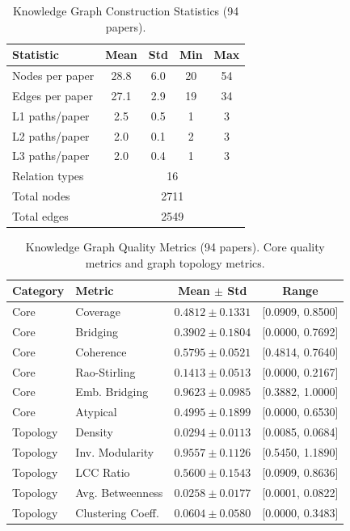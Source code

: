 \begin{table}[t]
\centering
\caption{Knowledge Graph Construction Statistics (94 papers).}
\label{tab:kg_stats}
\begin{tabular}{lcccc}
\toprule
\textbf{Statistic} & \textbf{Mean} & \textbf{Std} & \textbf{Min} & \textbf{Max} \\
\midrule
Nodes per paper  & 28.8 & 6.0 & 20 & 54 \\
Edges per paper  & 27.1 & 2.9 & 19 & 34 \\
L1 paths/paper   & 2.5 & 0.5 & 1 & 3 \\
L2 paths/paper   & 2.0 & 0.1 & 2 & 3 \\
L3 paths/paper   & 2.0 & 0.4 & 1 & 3 \\
Relation types   & \multicolumn{4}{c}{16} \\
Total nodes      & \multicolumn{4}{c}{2711} \\
Total edges      & \multicolumn{4}{c}{2549} \\
\bottomrule
\end{tabular}
\end{table}

\begin{table}[t]
\centering
\caption{Knowledge Graph Quality Metrics (94 papers). Core quality metrics and graph topology metrics.}
\label{tab:kg_metrics}
\begin{tabular}{llcc}
\toprule
\textbf{Category} & \textbf{Metric} & \textbf{Mean $\pm$ Std} & \textbf{Range} \\
\midrule
\multirow{1}{*}{Core} & Coverage & $0.4812 \pm 0.1331$ & [0.0909, 0.8500] \\
\multirow{1}{*}{Core} & Bridging & $0.3902 \pm 0.1804$ & [0.0000, 0.7692] \\
\multirow{1}{*}{Core} & Coherence & $0.5795 \pm 0.0521$ & [0.4814, 0.7640] \\
\multirow{1}{*}{Core} & Rao-Stirling & $0.1413 \pm 0.0513$ & [0.0000, 0.2167] \\
\multirow{1}{*}{Core} & Emb. Bridging & $0.9623 \pm 0.0985$ & [0.3882, 1.0000] \\
\multirow{1}{*}{Core} & Atypical & $0.4995 \pm 0.1899$ & [0.0000, 0.6530] \\
\midrule
\multirow{1}{*}{Topology} & Density & $0.0294 \pm 0.0113$ & [0.0085, 0.0684] \\
\multirow{1}{*}{Topology} & Inv. Modularity & $0.9557 \pm 0.1126$ & [0.5450, 1.1890] \\
\multirow{1}{*}{Topology} & LCC Ratio & $0.5600 \pm 0.1543$ & [0.0909, 0.8636] \\
\multirow{1}{*}{Topology} & Avg. Betweenness & $0.0258 \pm 0.0177$ & [0.0001, 0.0822] \\
\multirow{1}{*}{Topology} & Clustering Coeff. & $0.0604 \pm 0.0580$ & [0.0000, 0.3483] \\
\bottomrule
\end{tabular}
\end{table}

